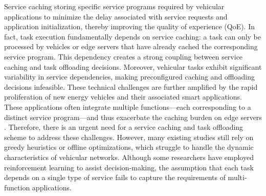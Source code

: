 \documentclass[lettersize,journal]{IEEEtran}
\begin{document}
Service caching  storing specific service programs required by vehicular applications to minimize the delay associated with service requests and application initialization, thereby improving the quality of experience (QoE).
In fact, task execution fundamentally depends on service caching: a task can only be processed by vehicles or edge servers that have already cached the corresponding service program. This dependency creates a strong coupling between service caching and task offloading decisions.
Moreover, vehicular tasks exhibit significant variability in service dependencies, making preconfigured caching and offloading decisions infeasible. 
These technical challenges are further amplified by the rapid proliferation of new energy vehicles and their associated smart applications. These applications often integrate multiple functions—each corresponding to a distinct service program—and thus exacerbate the caching burden on edge servers \cite{ShiCao-8}.
Therefore, there is an urgent need for a service caching and task offloading scheme to address these challenges.
However, many existing studies still rely on greedy heuristics or offline optimizations, which struggle to handle the dynamic characteristics of vehicular networks. 
Although some researchers have employed reinforcement learning to assist decision-making, the assumption that each task depends on a single type of service fails to capture the requirements of multi-function applications.
\end{document}
